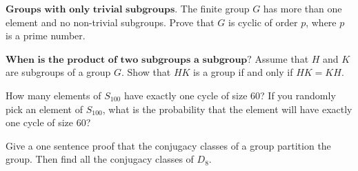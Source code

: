 \documentclass[12pt,letterpaper,boxed]{hmcpset}
\begin{document}

\begin{problem}[2.6.24]
$\textbf{Groups with only trivial subgroups.}$ The finite group $G$ has more than one element and no non-trivial subgroups. Prove that $G$ is cyclic of order $p$, where $p$ is a prime number. 
\end{problem}

\begin{solution}
\end{solution}

\clearpage

\begin{problem}[2.6.33]
$\textbf{When is the product of two subgroups a subgroup?}$ Assume that $H$ and $K$ are subgroups of a group $G$. Show that $HK$ is a group if and only if $HK = KH$.
\end{problem}

\begin{solution}

\end{solution}

\clearpage

\begin{problem}[3.3.3]
How many elements of $S_{100}$ have exactly one cycle of size 60? If you randomly pick an element of $S_{100}$, what is the probability that the element will have exactly one cycle of size 60?
\end{problem}

\begin{solution}
\end{solution}

\clearpage


\begin{problem}[4.4.6]
Give a one sentence proof that the conjugacy classes of a group partition the group. Then find all the conjugacy classes of $D_8$. 
\end{problem}

\begin{solution}
\end{solution}

\clearpage
\end{document}
